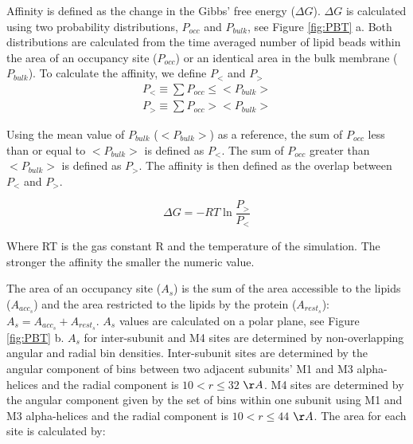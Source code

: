 Affinity is defined as the change in the Gibbs' free energy ($\Delta G$). $\Delta G$ is calculated using two probability distributions, $P_{occ}$ and $P_{bulk}$, see Figure \ref{fig:PBT} a. Both distributions are calculated from the time averaged number of lipid beads within the area of an occupancy site ($P_{occ}$) or an identical area in the bulk membrane ($P_{bulk}$).  
To calculate the affinity, we define $P_{<}$ and $P_{>}$
\begin{subequations}
    \begin{align}
    P_{<} \equiv \sum P_{occ} \leq \big< P_{bulk} \big> \label{eq:Pl} \\
    P_{>} \equiv \sum P_{occ} > \big< P_{bulk} \big> \label{eq:Pg}
    \end{align}
\end{subequations}

Using the mean value of $P_{bulk}$ ($ \big< P_{bulk} \big> $) as a reference, the sum of $P_{occ}$ less than or equal to   $\big< P_{bulk} \big> $ is defined as $P_{<}$. The sum of  $P_{occ}$ greater than  $\big< P_{bulk} \big> $ is defined as $P_{>}$. The affinity is then defined as the overlap between $P_{<}$ and $P_{>}$.

\begin{equation}
\Delta G = -RT\ln\frac{P_{>}}{P_{<}}
\label{eq:dG}
\end{equation}

Where RT is the gas constant R and the temperature of the simulation. The stronger the affinity the smaller the numeric value.

The area of an occupancy site ($A_s$) is the sum of the area accessible to the lipids ($A_{acc_s}$) and the area restricted to the lipids by the protein ($A_{rest_s}$): $A_s = A_{acc_s} + A_{rest_s}$.  $A_s$ values are calculated on a polar plane, see Figure \ref{fig:PBT} b. $A_s$ for inter-subunit and M4 sites are determined by non-overlapping angular and radial bin densities. Inter-subunit sites are determined by the angular component of bins between two adjacent subunits' M1 and M3 alpha-helices and the radial component is $10<r\leq32$ $\AA $.  M4 sites are determined by the angular component given by the set of bins within one subunit using M1 and M3 alpha-helices and the radial component is $10<r\leq44$ $\AA$. The area for each site is calculated by:

